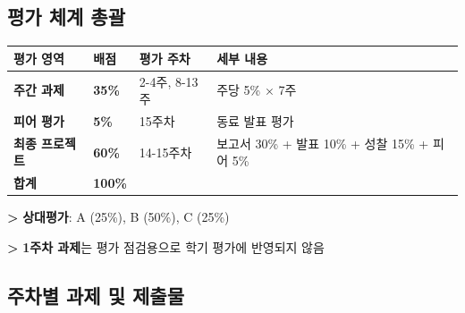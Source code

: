 \documentclass[11pt, a4paper]{article}
\newcommand{\note}[1]{%
    \vspace{3pt}
    \noindent\textcolor{textgray}{\textbf{>} #1}
    \vspace{3pt}
}
\begin{document}
\subsection{평가 체계 총괄}

\begin{table}[H]
\centering
\begin{tabular}{|L{4cm}|C{2cm}|C{4cm}|L{4cm}|}
\hline
{}
\textbf{평가 영역} & \textbf{배점} & \textbf{평가 주차} & \textbf{세부 내용} \\
\hline
\textbf{주간 과제} & \textbf{35\%} & 2-4주, 8-13주 & 주당 5\% × 7주 \\
\hline
\textbf{피어 평가} & \textbf{5\%} & 15주차 & 동료 발표 평가 \\
\hline
\textbf{최종 프로젝트} & \textbf{60\%} & 14-15주차 & 보고서 30\% + 발표 10\% + 성찰 15\% + 피어 5\% \\
\hline
\textbf{합계} & \textbf{100\%} & & \\
\hline
\end{tabular}
\end{table}

\note{\textbf{상대평가}: A (25\%), B (50\%), C (25\%)}

\note{\textbf{1주차 과제}는 평가 점검용으로 학기 평가에 반영되지 않음}

\subsection{주차별 과제 및 제출물}
\end{document}
